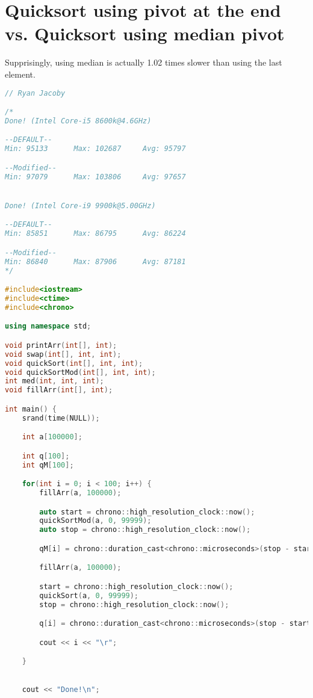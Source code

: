 \documentclass[letterpaper, 11pt]{article}
\begin{document}
\section{Quicksort using pivot at the end vs. Quicksort using median pivot}

Supprisingly, using median is actually 1.02 times slower than using the last element.

\begin{lstlisting}[language=c++, caption=main.cpp]
// Ryan Jacoby

/*
Done! (Intel Core-i5 8600k@4.6GHz)

--DEFAULT--
Min: 95133      Max: 102687     Avg: 95797

--Modified--
Min: 97079      Max: 103806     Avg: 97657


Done! (Intel Core-i9 9900k@5.00GHz)

--DEFAULT--
Min: 85851      Max: 86795      Avg: 86224

--Modified--
Min: 86840      Max: 87906      Avg: 87181
*/

#include<iostream>
#include<ctime>
#include<chrono>

using namespace std;

void printArr(int[], int);
void swap(int[], int, int);
void quickSort(int[], int, int);
void quickSortMod(int[], int, int);
int med(int, int, int);
void fillArr(int[], int);

int main() {
    srand(time(NULL));

    int a[100000];

    int q[100];
    int qM[100];

    for(int i = 0; i < 100; i++) {
        fillArr(a, 100000);

        auto start = chrono::high_resolution_clock::now();
        quickSortMod(a, 0, 99999);
        auto stop = chrono::high_resolution_clock::now();

        qM[i] = chrono::duration_cast<chrono::microseconds>(stop - start).count();

        fillArr(a, 100000);

        start = chrono::high_resolution_clock::now();
        quickSort(a, 0, 99999);
        stop = chrono::high_resolution_clock::now();

        q[i] = chrono::duration_cast<chrono::microseconds>(stop - start).count();

        cout << i << "\r";

    }
    

    cout << "Done!\n";


\end{lstlisting}
\end{document}
